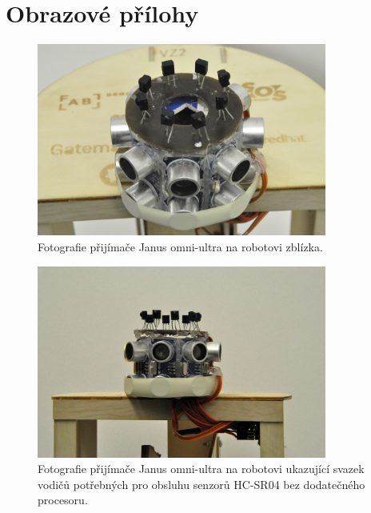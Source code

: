 \chapter{Obrazové přílohy}

\begin{figure}[htbp]
    \centering
    \includegraphics[width=0.85\textwidth]{img/prijimac-1.JPG}
    \caption{Fotografie přijímače Janus omni-ultra na robotovi zblízka.}
    \label{fig:prijimac1}
\end{figure}

\begin{figure}[htbp]
    \centering
    \includegraphics[width=0.85\textwidth]{img/prijimac-2.JPG}
    \caption{Fotografie přijímače Janus omni-ultra na robotovi ukazující svazek vodičů potřebných pro obsluhu senzorů HC-SR04 bez dodatečného procesoru.}
    \label{fig:prijimac2}
\end{figure}


